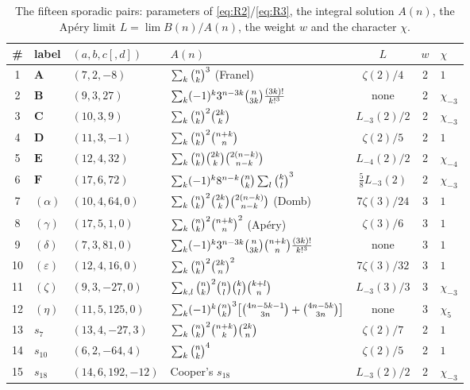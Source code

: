 \begin{table}[ht]
\centering\footnotesize\setlength{\tabcolsep}{4pt}
\caption{The fifteen sporadic pairs: parameters of \eqref{eq:R2}/\eqref{eq:R3}, the
integral solution $A(n)$, the Ap\'ery limit $L=\lim B(n)/A(n)$, the weight $w$ and the
character $\chi$.}
\label{tab:fifteen}
\begin{tabular}{@{}clllccl@{}}
\toprule
\# & label & $(a,b,c[,d])$ & $A(n)$ & $L$ & $w$ & $\chi$\\
\midrule
1 & $\mathbf A$ & $(7,2,-8)$ & $\sum_k\binom{n}{k}^3$ (Franel) & $\zeta(2)/4$ & 2 & $1$\\
2 & $\mathbf B$ & $(9,3,27)$ & $\sum_k(-1)^k3^{n-3k}\binom{n}{3k}\frac{(3k)!}{k!^3}$ & none & 2 & $\chi_{-3}$\\
3 & $\mathbf C$ & $(10,3,9)$ & $\sum_k\binom{n}{k}^2\binom{2k}{k}$ & $L_{-3}(2)/2$ & 2 & $\chi_{-3}$\\
4 & $\mathbf D$ & $(11,3,-1)$ & $\sum_k\binom{n}{k}^2\binom{n+k}{n}$ & $\zeta(2)/5$ & 2 & $1$\\
5 & $\mathbf E$ & $(12,4,32)$ & $\sum_k\binom{n}{k}\binom{2k}{k}\binom{2(n-k)}{n-k}$ & $L_{-4}(2)/2$ & 2 & $\chi_{-4}$\\
6 & $\mathbf F$ & $(17,6,72)$ & $\sum_k(-1)^k8^{n-k}\binom{n}{k}\sum_l\binom{k}{l}^3$ & $\tfrac58L_{-3}(2)$ & 2 & $\chi_{-3}$\\
7 & $(\alpha)$ & $(10,4,64,0)$ & $\sum_k\binom{n}{k}^2\binom{2k}{k}\binom{2(n-k)}{n-k}$ (Domb) & $7\zeta(3)/24$ & 3 & $1$\\
8 & $(\gamma)$ & $(17,5,1,0)$ & $\sum_k\binom{n}{k}^2\binom{n+k}{n}^2$ (Ap\'ery) & $\zeta(3)/6$ & 3 & $1$\\
9 & $(\delta)$ & $(7,3,81,0)$ & $\sum_k(-1)^k3^{n-3k}\binom{n}{3k}\binom{n+k}{n}\frac{(3k)!}{k!^3}$ & none & 3 & $1$\\
10 & $(\varepsilon)$ & $(12,4,16,0)$ & $\sum_k\binom{n}{k}^2\binom{2k}{n}^2$ & $7\zeta(3)/32$ & 3 & $1$\\
11 & $(\zeta)$ & $(9,3,-27,0)$ & $\sum_{k,l}\binom{n}{k}^2\binom{n}{l}\binom{k}{l}\binom{k+l}{n}$ & $L_{-3}(3)/3$ & 3 & $\chi_{-3}$\\
12 & $(\eta)$ & $(11,5,125,0)$ & $\sum_k(-1)^k\binom{n}{k}^3\bigl[\binom{4n-5k-1}{3n}+\binom{4n-5k}{3n}\bigr]$ & none & 3 & $\chi_5$\\
13 & $s_7$ & $(13,4,-27,3)$ & $\sum_k\binom{n}{k}^2\binom{n+k}{k}\binom{2k}{n}$ & $\zeta(2)/7$ & 2 & $1$\\
14 & $s_{10}$ & $(6,2,-64,4)$ & $\sum_k\binom{n}{k}^4$ & $\zeta(2)/5$ & 2 & $1$\\
15 & $s_{18}$ & $(14,6,192,-12)$ & Cooper's $s_{18}$ & $L_{-3}(2)/2$ & 2 & $\chi_{-3}$\\
\bottomrule
\end{tabular}
\end{table}

